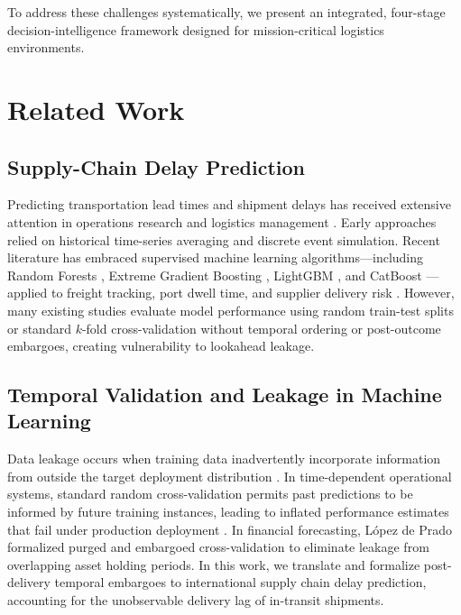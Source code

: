 \documentclass[11pt,a4paper]{article}
\begin{document}
To address these challenges systematically, we present an integrated, four-stage decision-intelligence framework designed for mission-critical logistics environments.

\section{Related Work}
\subsection{Supply-Chain Delay Prediction}
Predicting transportation lead times and shipment delays has received extensive attention in operations research and logistics management \cite{baryannis2019supply}. Early approaches relied on historical time-series averaging and discrete event simulation. Recent literature has embraced supervised machine learning algorithms---including Random Forests \cite{breiman2001random}, Extreme Gradient Boosting \cite{chen2016xgboost}, LightGBM \cite{ke2017lightgbm}, and CatBoost \cite{prokhorenkova2018catboost}---applied to freight tracking, port dwell time, and supplier delivery risk \cite{baryannis2019supply, chawla2002smote}. However, many existing studies evaluate model performance using random train-test splits or standard $k$-fold cross-validation without temporal ordering or post-outcome embargoes, creating vulnerability to lookahead leakage.

\subsection{Temporal Validation and Leakage in Machine Learning}
Data leakage occurs when training data inadvertently incorporate information from outside the target deployment distribution \cite{kapoor2023leakage}. In time-dependent operational systems, standard random cross-validation permits past predictions to be informed by future training instances, leading to inflated performance estimates that fail under production deployment \cite{roberts2017crossvalidation, bergmeir2012use}. In financial forecasting, López de Prado \cite{deprado2018advances} formalized purged and embargoed cross-validation to eliminate leakage from overlapping asset holding periods. In this work, we translate and formalize post-delivery temporal embargoes to international supply chain delay prediction, accounting for the unobservable delivery lag of in-transit shipments.
\end{document}
